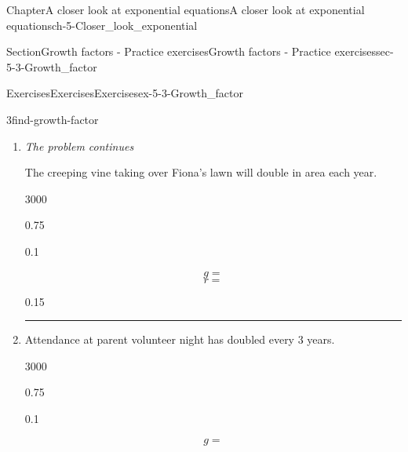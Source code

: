 \documentclass[twoside,11pt,]{book}
\newlength{\workspacestrutwidth}
\numberwithin{equation}{section}
\begin{document}
\begin{chapterptx}{Chapter}{A closer look at exponential equations}{}{A closer look at exponential equations}{}{}{ch-5-Closer_look_exponential}
\begin{sectionptx}{Section}{Growth factors - Practice exercises}{}{Growth factors - Practice exercises}{}{}{sec-5-3-Growth_factor}
\begin{exercises-subsection-numberless}{Exercises}{Exercises}{}{Exercises}{}{}{ex-5-3-Growth_factor}
\begin{divisionexercise}{3}{}{}{find-growth-factor}
\begin{enumerate}[label=(\alph*),ref=\alph*]
\begin{sidebyside}{3}{0}{0}{0}%
\begin{sbspanel}{0.75}%
%
\end{sbspanel}%
\begin{sbspanel}{0.1}%
\par
%
\begin{equation*}
g=
\end{equation*}
%
\begin{equation*}
r =
\end{equation*}
%
\end{sbspanel}%
\begin{sbspanel}{0.15}%
\par
%
\end{sbspanel}%
\end{sidebyside}%
\par\rule{\workspacestrutwidth}{1cm}%
\item{}\emph{The problem continues \textellipsis{}}%
\par
The creeping vine taking over Fiona's lawn will double in area each year.%
\begin{sidebyside}{3}{0}{0}{0}%
\begin{sbspanel}{0.75}%
%
\end{sbspanel}%
\begin{sbspanel}{0.1}%
\par
%
\begin{equation*}
g=
\end{equation*}
%
\begin{equation*}
r =
\end{equation*}
%
\end{sbspanel}%
\begin{sbspanel}{0.15}%
\par
%
\end{sbspanel}%
\end{sidebyside}%
\par\rule{\workspacestrutwidth}{1.75cm}%
\item{}Attendance at parent volunteer night has doubled every 3 years.%
\begin{sidebyside}{3}{0}{0}{0}%
\begin{sbspanel}{0.75}%
%
\end{sbspanel}%
\begin{sbspanel}{0.1}%
\par
%
\begin{equation*}
g=
\end{equation*}
%
\begin{equation*}

\end{equation*}
\end{sbspanel}
\end{sidebyside}
\end{enumerate}
\end{divisionexercise}
\end{exercises-subsection-numberless}
\end{sectionptx}
\end{chapterptx}
\end{document}
